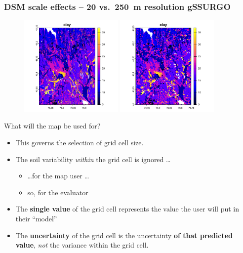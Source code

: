 \documentclass[aspectratio=169]{beamer}
\begin{document}
\begin{frame}
  \frametitle{DSM scale effects -- 20 vs.\ 250~m resolution gSSURGO}
    \begin{figure}
    \centering
\includegraphics[width=0.45\textwidth]{./graphics_david/ClydeNY_gSSURGO_20.png}
\hfill
\includegraphics[width=0.45\textwidth]{./graphics_david/ClydeNY_gSSURGO_250.png}
\end{figure}  
\end{frame}

\begin{frame}{What will the map be used for?}
    \begin{itemize}
        \item This governs the selection of grid cell size.
        \item The soil variability \emph{within} the grid cell is ignored \ldots
        \begin{itemize}
            \item \ldots for the map user \ldots
            \item so, for the evaluator
        \end{itemize}
        \item The \textbf{single value} of the grid cell represents the value the user will put in their ``model''
        \item The \textbf{uncertainty} of the grid cell is the uncertainty \textbf{of that predicted value}, \emph{not} the variance within the grid cell.
    \end{itemize}
\end{frame}
\end{document}
